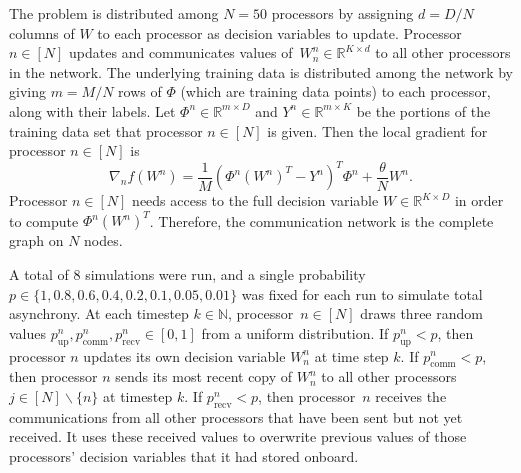 \documentclass[9pt,shortpaper,twoside,web]{ieeecolor}
\newcommand{\R}{\ensuremath{\mathbb{R}}\xspace}
\newcommand{\blue}[1]{{\textcolor{blue}{#1}}}
\begin{document}
    The problem is distributed among $N=50$ processors by assigning $d=D/N$ columns of $W$ to each 
    processor as decision variables to update.
    Processor $n\in[N]$ updates and communicates values of~$W^n_n\in\R^{K\times d}$ to all other processors in the network.
    The underlying training data is distributed among the network by giving $m=M/N$ rows of $\Phi$ (which are training data points) to each processor, along with their labels. 
    Let $\Phi^n\in\R^{m\times D}$ and $Y^n\in\R^{m\times K}$ be the portions of the training data set that processor $n\in[N]$ is given.
    Then the local gradient for processor $n\in[N]$ is
    \begin{equation}
       \nabla_n f(W^n)=\frac{1}{M}(\Phi^n(W^{n})^T-Y^n)^T\Phi^n+\frac{\theta}{N}W^n.
        \end{equation}
    Processor $n\in[N]$ needs access to the full decision variable $W\in\R^{K\times D}$ in order to compute $\Phi^n(W^{n})^T$.
    Therefore, the communication network is the complete graph on $N$ nodes.


    A total of 8 simulations were run, and
    a single probability~$p\in\{1,0.8,0.6,0.4,0.2,0.1,0.05,0.01\}$ was fixed for each run 
    to simulate total asynchrony.
    At each timestep $k\in\mathbb{N}$, 
    processor~$n \in [N]$ draws three random values $p^n_{\text{up}},p^n_\text{comm},p^n_\text{recv}\in[0,1]$ from a uniform distribution.
    If $p^n_\text{up} < p$, then processor $n$ updates its own decision variable $W^n_n$ at time step $k$. 
    If $p_\text{comm}^n < p$, then processor $n$ sends its most recent copy of $W^n_n$ to all other processors $j\in[N]\backslash \{n\}$ at timestep $k$. 
    If $p_\text{recv}^n < p$, 
    then processor~$n$ receives the communications from all other processors that have been sent but not yet received. 
    It uses these received values to overwrite previous values of those processors' decision variables that it had stored onboard.
    
\end{document}
